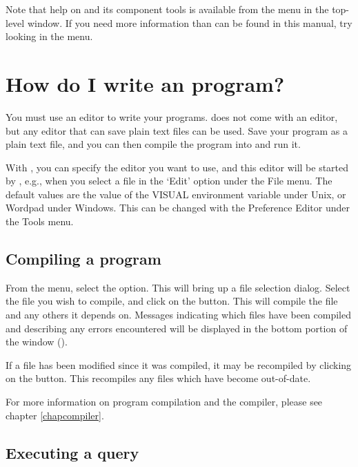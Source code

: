 Note that help on {\tkeclipse} and its component tools is available from the
 menu in the top-level window.
If you need more information than can be found in this manual, try looking
in the  menu.

\section{How do I write an {\eclipse} program?}
You must use an editor to write your programs. {\eclipse} does not come
with an editor, but any editor that can save plain text files can be used.
Save your program as a plain text file, and you can then compile the
program into {\eclipse} and run it.

With {\tkeclipse}, you can specify the editor you want to use, and this
editor will be started by {\tkeclipse}, e.g., when you select a file in
the `Edit' option under the File menu. The default values are the value of
the VISUAL environment variable  under Unix, or Wordpad under Windows.
This can be changed with the Preference Editor under the Tools menu.

\subsection{Compiling a program}

From the  menu, select the  option.
This will bring up a file selection dialog.
Select the file you wish to compile, and click on the  button.
This will compile the file and any others it depends on.
Messages indicating which files have been compiled and describing any errors
encountered will be displayed in the bottom portion of the {\tkeclipse}
window ().

If a file has been modified since it was compiled,
it may be recompiled by clicking on the  button.
This recompiles any files which have become out-of-date.

For more information on program compilation and the compiler, please see
chapter \ref{chapcompiler}.

\subsection{Executing a query}

